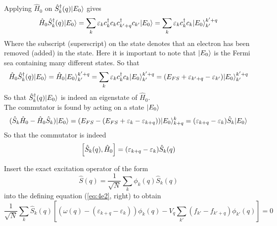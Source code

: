 \begin{solution}
Applying $\hat{H}_0$ on $ \hat{S}_k^{\dagger}(q) |E_0\rangle$ gives
\begin{equation}
    \hat{H}_0 \hat{S}_k^{\dagger}(q) |E_0\rangle = \sum_k \varepsilon_k c_k^{\dagger} c_k c_{k'+q}^{\dagger} c_{k'} |E_0\rangle = \sum_k \varepsilon_k c_k^{\dagger} c_k |E_0\rangle_{k'}^{k'+q}
\end{equation}
Where the subscript (superscript) on the state denotes that an electron has been removed (added) in the state. Here it is important to note that $|E_0\rangle$ is the Fermi sea containing many different states. So that 
\begin{equation}
     \hat{H}_0 \hat{S}_k^{\dagger}(q) |E_0\rangle =  \hat{H}_0 |E_0\rangle_{k'}^{k'+q} = \sum_k \varepsilon_k c_k^{\dagger} c_k |E_0\rangle_{k'}^{k'+q} = (E_{FS} + \varepsilon_{k'+q} - \varepsilon_{k'})|E_0\rangle_{k'}^{k'+q}
\end{equation}
So that $ \hat{S}_k^{\dagger}(q) |E_0\rangle$ is indeed an eigenstate of $\hat{H}_0$. \\
The commutator is found by acting on a state $|E_0\rangle$
\begin{equation}
   (\hat{S}_k \hat{H}_0 - \hat{H}_0 \hat{S}_k) |E_0\rangle = (E_{FS} - (E_{FS} +\varepsilon_{k} - \varepsilon_{k+q})) |E_0\rangle_{k+q}^k = (\varepsilon_{k+q} - \varepsilon_{k}) \hat{S}_k |E_0\rangle
\end{equation}
So that the commutator is indeed
\begin{equation}
    \comm{\hat{S}_k(q)}{\hat{H}_0} = (\varepsilon_{k+q}-\varepsilon_k) \hat{S}_k(q)
\end{equation}
\end{solution}




\begin{exercise}
Insert the exact excitation operator of the form
\begin{equation}
    \hat{S}(q) = \dfrac{1}{\sqrt{N}}\sum_k \phi_k(q)\hat{S}_k(q)
    \label{eq:417}
\end{equation}
into the defining equation (\eqref{eq:4e2}, right) to obtain 
\begin{equation}
    \dfrac{1}{\sqrt{N}}\sum_k \hat{S}_k(q) \left[(\omega(q) - (\varepsilon_{k+q}-\varepsilon_k))\phi_k(q) - V_{q}\sum_{k'}(f_{k'}-f_{k'+q})\phi_{k'}(q) \right] = 0
\end{equation}
\end{exercise}

